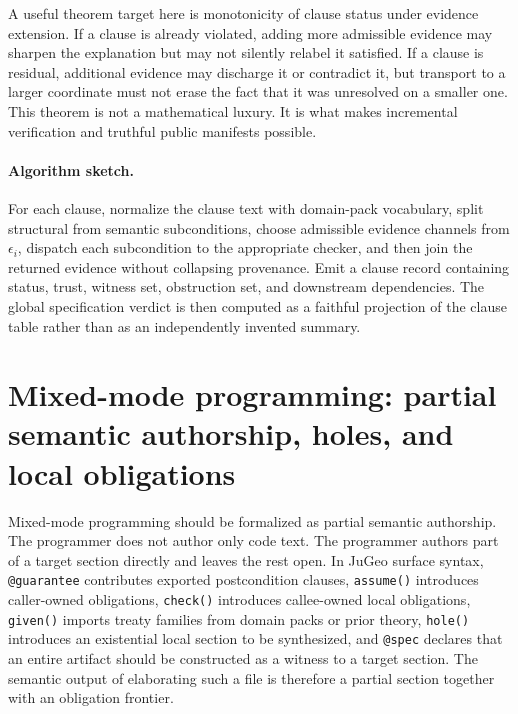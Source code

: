 \documentclass[11pt]{report}
\begin{document}
A useful theorem target here is monotonicity of clause status under evidence extension. If a clause is already violated, adding more admissible evidence may sharpen the explanation but may not silently relabel it satisfied. If a clause is residual, additional evidence may discharge it or contradict it, but transport to a larger coordinate must not erase the fact that it was unresolved on a smaller one. This theorem is not a mathematical luxury. It is what makes incremental verification and truthful public manifests possible.

\paragraph{Algorithm sketch.}
For each clause, normalize the clause text with domain-pack vocabulary, split structural from semantic subconditions, choose admissible evidence channels from $\epsilon_i$, dispatch each subcondition to the appropriate checker, and then join the returned evidence without collapsing provenance. Emit a clause record containing status, trust, witness set, obstruction set, and downstream dependencies. The global specification verdict is then computed as a faithful projection of the clause table rather than as an independently invented summary.
\section{Mixed-mode programming: partial semantic authorship, holes, and local obligations}
Mixed-mode programming should be formalized as partial semantic authorship. The programmer does not author only code text. The programmer authors part of a target section directly and leaves the rest open. In JuGeo surface syntax, \texttt{@guarantee} contributes exported postcondition clauses, \texttt{assume()} introduces caller-owned obligations, \texttt{check()} introduces callee-owned local obligations, \texttt{given()} imports treaty families from domain packs or prior theory, \texttt{hole()} introduces an existential local section to be synthesized, and \texttt{@spec} declares that an entire artifact should be constructed as a witness to a target section. The semantic output of elaborating such a file is therefore a partial section together with an obligation frontier.
\end{document}
